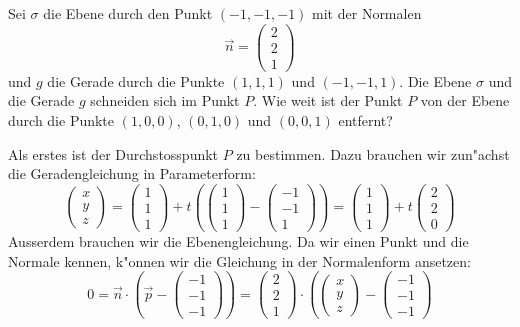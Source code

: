 Sei $\sigma$ die Ebene durch den Punkt $(-1,-1,-1)$ mit der Normalen 
\[
\vec n=\begin{pmatrix}2\\2\\1\end{pmatrix}
\]
und $g$ die Gerade durch die Punkte $(1,1,1)$ und $(-1,-1,1)$.
Die Ebene $\sigma$ und die Gerade $g$ schneiden sich im Punkt $P$.
Wie weit ist der Punkt $P$ von der Ebene durch die Punkte
$(1,0,0)$, $(0,1,0)$ und $(0,0,1)$ entfernt?

\begin{loesung}
Als erstes ist der Durchstosspunkt $P$ zu bestimmen.
Dazu brauchen wir zun"achst die Geradengleichung in Parameterform:
\[
\begin{pmatrix} x\\y\\z \end{pmatrix}
=
\begin{pmatrix}1\\1\\1\end{pmatrix}+t
\left(
\begin{pmatrix}1\\1\\1\end{pmatrix}
-
\begin{pmatrix}-1\\-1\\1\end{pmatrix}
\right)
=
\begin{pmatrix}1\\1\\1\end{pmatrix}+t
\begin{pmatrix}2\\2\\0\end{pmatrix}
\]
Ausserdem brauchen wir die Ebenengleichung. Da wir einen Punkt und
die Normale kennen, k"onnen wir die Gleichung in der Normalenform
ansetzen:
\[
0=\vec n\cdot \left(\vec p-\begin{pmatrix}-1\\-1\\-1\end{pmatrix}\right)
=
\begin{pmatrix}2\\2\\1\end{pmatrix}\cdot\left(
\begin{pmatrix}x\\y\\z\end{pmatrix}-\begin{pmatrix}-1\\-1\\-1\end{pmatrix}
\]
\end{loesung}
